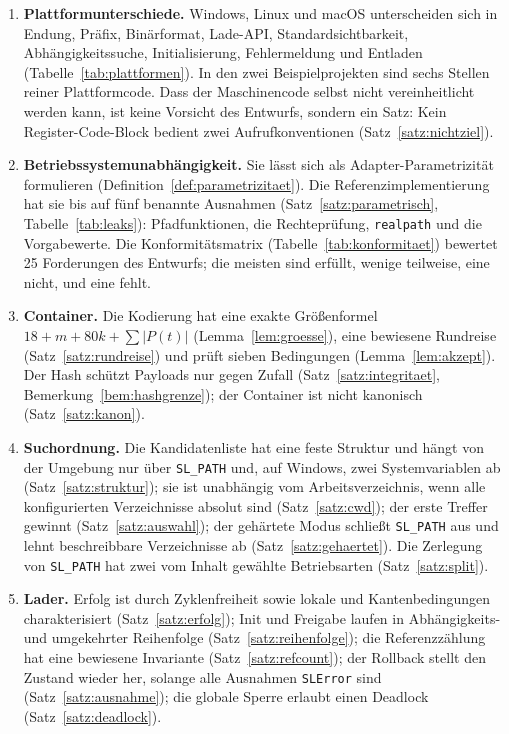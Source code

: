 \begin{enumerate}
	\item \textbf{Plattformunterschiede.} Windows, Linux und macOS unterscheiden sich in Endung, Präfix, Binärformat, Lade-API, Standardsichtbarkeit, Abhängigkeitssuche, Initialisierung, Fehlermeldung und Entladen (Tabelle~\ref{tab:plattformen}). In den zwei Beispielprojekten sind sechs Stellen reiner Plattformcode. Dass der Maschinencode selbst nicht vereinheitlicht werden kann, ist keine Vorsicht des Entwurfs, sondern ein Satz: Kein Register-Code-Block bedient zwei Aufrufkonventionen (Satz~\ref{satz:nichtziel}).
	\item \textbf{Betriebssystemunabhängigkeit.} Sie lässt sich als Adapter-Parametrizität formulieren (Definition~\ref{def:parametrizitaet}). Die Referenzimplementierung hat sie bis auf fünf benannte Ausnahmen (Satz~\ref{satz:parametrisch}, Tabelle~\ref{tab:leaks}): Pfadfunktionen, die Rechteprüfung, \texttt{realpath} und die Vorgabewerte. Die Konformitätsmatrix (Tabelle~\ref{tab:konformitaet}) bewertet 25 Forderungen des Entwurfs; die meisten sind erfüllt, wenige teilweise, eine nicht, und eine fehlt.
	\item \textbf{Container.} Die Kodierung hat eine exakte Größenformel $18+m+80k+\sum|P(t)|$ (Lemma~\ref{lem:groesse}), eine bewiesene Rundreise (Satz~\ref{satz:rundreise}) und prüft sieben Bedingungen (Lemma~\ref{lem:akzept}). Der Hash schützt Payloads nur gegen Zufall (Satz~\ref{satz:integritaet}, Bemerkung~\ref{bem:hashgrenze}); der Container ist nicht kanonisch (Satz~\ref{satz:kanon}).
	\item \textbf{Suchordnung.} Die Kandidatenliste hat eine feste Struktur und hängt von der Umgebung nur über \texttt{SL\_PATH} und, auf Windows, zwei Systemvariablen ab (Satz~\ref{satz:struktur}); sie ist unabhängig vom Arbeitsverzeichnis, wenn alle konfigurierten Verzeichnisse absolut sind (Satz~\ref{satz:cwd}); der erste Treffer gewinnt (Satz~\ref{satz:auswahl}); der gehärtete Modus schließt \texttt{SL\_PATH} aus und lehnt beschreibbare Verzeichnisse ab (Satz~\ref{satz:gehaertet}). Die Zerlegung von \texttt{SL\_PATH} hat zwei vom Inhalt gewählte Betriebsarten (Satz~\ref{satz:split}).
	\item \textbf{Lader.} Erfolg ist durch Zyklenfreiheit sowie lokale und Kantenbedingungen charakterisiert (Satz~\ref{satz:erfolg}); Init und Freigabe laufen in Abhängigkeits- und umgekehrter Reihenfolge (Satz~\ref{satz:reihenfolge}); die Referenzzählung hat eine bewiesene Invariante (Satz~\ref{satz:refcount}); der Rollback stellt den Zustand wieder her, solange alle Ausnahmen \texttt{SLError} sind (Satz~\ref{satz:ausnahme}); die globale Sperre erlaubt einen Deadlock (Satz~\ref{satz:deadlock}).

\end{enumerate}
